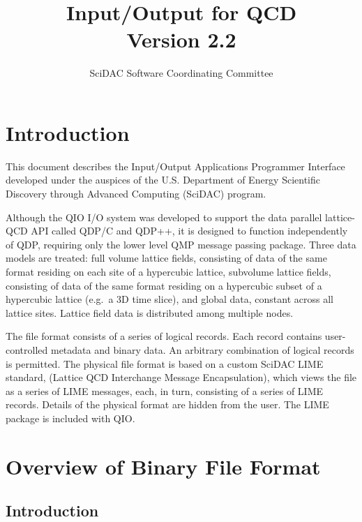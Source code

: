 \documentclass{article}
\begin{document}
\title{
   Input/Output for QCD \\{\large Version 2.2}
}
\author{ SciDAC Software Coordinating Committee}

\maketitle
\section{Introduction}
This document describes the Input/Output Applications Programmer
Interface developed under the auspices of the U.S. Department of
Energy Scientific Discovery through Advanced Computing (SciDAC)
program.

Although the QIO I/O system was developed to support the data parallel
lattice-QCD API called QDP/C and QDP++, it is designed to function
independently of QDP, requiring only the lower level QMP message
passing package.  Three data models are treated: full volume lattice
fields, consisting of data of the same format residing on each site of
a hypercubic lattice, subvolume lattice fields, consisting of data of
the same format residing on a hypercubic subset of a hypercubic
lattice (e.g.\ a 3D time slice), and global data, constant across all
lattice sites.  Lattice field data is distributed among multiple
nodes.

The file format consists of a series of logical records.  Each record
contains user-controlled metadata and binary data.  An arbitrary
combination of logical records is permitted.  The physical file format
is based on a custom SciDAC LIME standard, (Lattice QCD Interchange
Message Encapsulation), which views the file as a series of LIME
messages, each, in turn, consisting of a series of LIME records.
Details of the physical format are hidden from the user.  The LIME
package is included with QIO.

\section{Overview of Binary File Format}
\label{sec.fileformat}

\subsection{Introduction}
\end{document}
